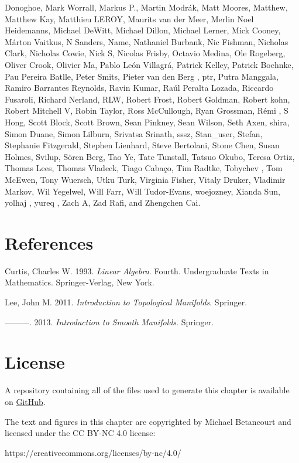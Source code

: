 \documentclass[
  letterpaper,
  DIV=11,
  numbers=noendperiod]{scrartcl}
\newlength{\cslhangindent}
\newlength{\cslentryspacingunit} %
\newenvironment{CSLReferences}[2] %
 {%
  \setlength{\parindent}{0pt}
  \ifodd #1
  \let\oldpar\par
  \def\par{\hangindent=\cslhangindent\oldpar}
  \fi
  \setlength{\parskip}{#2\cslentryspacingunit}
 }%
 {}
\begin{document}
Donoghoe, Mark Worrall, Markus P., Martin Modrák, Matt Moores, Matthew,
Matthew Kay, Matthieu LEROY, Maurits van der Meer, Merlin Noel
Heidemanns, Michael DeWitt, Michael Dillon, Michael Lerner, Mick Cooney,
Márton Vaitkus, N Sanders, Name, Nathaniel Burbank, Nic Fishman,
Nicholas Clark, Nicholas Cowie, Nick S, Nicolas Frisby, Octavio Medina,
Ole Rogeberg, Oliver Crook, Olivier Ma, Pablo León Villagrá, Patrick
Kelley, Patrick Boehnke, Pau Pereira Batlle, Peter Smits, Pieter van den
Berg , ptr, Putra Manggala, Ramiro Barrantes Reynolds, Ravin Kumar, Raúl
Peralta Lozada, Riccardo Fusaroli, Richard Nerland, RLW, Robert Frost,
Robert Goldman, Robert kohn, Robert Mitchell V, Robin Taylor, Ross
McCullough, Ryan Grossman, Rémi , S Hong, Scott Block, Scott Brown, Sean
Pinkney, Sean Wilson, Seth Axen, shira, Simon Duane, Simon Lilburn,
Srivatsa Srinath, sssz, Stan\_user, Stefan, Stephanie Fitzgerald,
Stephen Lienhard, Steve Bertolani, Stone Chen, Susan Holmes, Svilup,
Sören Berg, Tao Ye, Tate Tunstall, Tatsuo Okubo, Teresa Ortiz, Thomas
Lees, Thomas Vladeck, Tiago Cabaço, Tim Radtke, Tobychev , Tom McEwen,
Tony Wuersch, Utku Turk, Virginia Fisher, Vitaly Druker, Vladimir
Markov, Wil Yegelwel, Will Farr, Will Tudor-Evans, woejozney, Xianda
Sun, yolhaj , yureq , Zach A, Zad Rafi, and Zhengchen Cai.

\hypertarget{references}{%
\section*{References}\label{references}}

\hypertarget{refs}{}
\begin{CSLReferences}{1}{0}
\leavevmode{}%
Curtis, Charles W. 1993. \emph{Linear Algebra}. Fourth. Undergraduate
Texts in Mathematics. Springer-Verlag, New York.

\leavevmode{}%
Lee, John M. 2011. \emph{Introduction to Topological Manifolds}.
Springer.

\leavevmode{}%
---------. 2013. \emph{Introduction to Smooth Manifolds}. Springer.

\end{CSLReferences}

\hypertarget{license}{%
\section*{License}\label{license}}

A repository containing all of the files used to generate this chapter
is available on
\href{https://github.com/betanalpha/quarto_chapters/tree/main/2_spaces}{GitHub}.

The text and figures in this chapter are copyrighted by Michael
Betancourt and licensed under the CC BY-NC 4.0 license:

https://creativecommons.org/licenses/by-nc/4.0/
\end{document}

